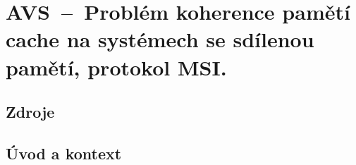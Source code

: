 

\graphicspath{{avs/koherence_pameti_cache/figures}}



\chapter{AVS~--~Problém koherence pamětí cache na systémech se sdílenou pamětí, protokol MSI.}


\section{Zdroje}

\begin{compactitem}
    \item {}
    \item {}
    \item {}
    \item {}
\end{compactitem}


\section{Úvod a kontext}

\begin{compactitem}
    \item {}
\end{compactitem}
